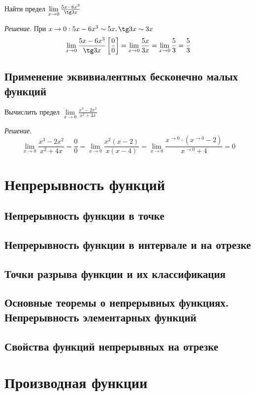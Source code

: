 \documentclass[14pt]{extreport}
\begin{document}
\begin{example}Найти предел $\lim\limits_{x\to0}\frac{5x-6x^3}{\tg3x}$

\emph{Решение}. При $x\rightarrow0:5x-6x^3\sim5x, \tg3x\sim3x$
$$\lim\limits_{x\to0}\frac{5x-6x^3}{\tg3x}\left[\frac{0}{0}\right]=\lim\limits_{x\to0}\frac{5x}{3x}=\lim\limits_{x\to0}\frac{5}{3}=\frac{5}{3}$$

\end{example}


\section{Применение эквивиалентных бесконечно малых функций}
\begin{example}Вычислить предел $\lim\limits_{x\to0}\frac{x^3-2x^2}{x^2+4x}$ 

\emph{Решение.} $$\lim\limits_{x\to0}\frac{x^3-2x^2}{x^2+4x}=\frac{0}{0}=\lim\limits_{x\to0}\frac{x^2(x-2)}{x(x-4)}=\lim\limits_{x\to0}\frac{x^{\rightarrow0}\cdot(x^{\rightarrow0}-2)}{x^{\rightarrow0}+4}=0$$
\end{example}


\chapter{Непрерывность функций}

\section{Непрерывность функции в точке}

\section{Непрерывность функции в интервале и на отрезке}

\section{Точки разрыва функции и их классификация}

\section{Основные теоремы о непрерывных функциях. Непрерывность элементарных функций}

\section{Свойства функций непрерывных на отрезке}



\chapter{Производная функции}
\end{document}
